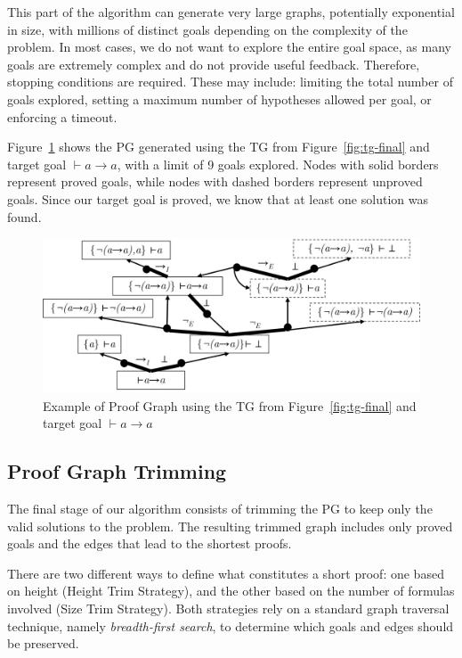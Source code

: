 This part of the algorithm can generate very large graphs, potentially exponential in size, with millions of distinct goals depending on the complexity of the problem. In most cases, we do not want to explore the entire goal space, as many goals are extremely complex and do not provide useful feedback. Therefore, stopping conditions are required. These may include: limiting the total number of goals explored, setting a maximum number of hypotheses allowed per goal, or enforcing a timeout.

Figure~\ref{fig:st-ex} shows the PG generated using the TG from Figure~\ref{fig:tg-final} and target goal \(\vdash a \to a\), with a limit of 9 goals explored. Nodes with solid borders represent proved goals, while nodes with dashed borders represent unproved goals. Since our target goal is proved, we know that at least one solution was found.

\begin{figure}
    \centering
    \includegraphics[width=0.8\linewidth]{resources/sg-gen.jpg}
    \caption{Example of Proof Graph using the TG from Figure~\ref{fig:tg-final} and target goal \(\vdash a \to a\)}
    \label{fig:st-ex}
\end{figure}

\subsection{Proof Graph Trimming}

The final stage of our algorithm consists of trimming the PG to keep only the valid solutions to the problem. The resulting trimmed graph includes only proved goals and the edges that lead to the shortest proofs.

There are two different ways to define what constitutes a short proof: one based on height (Height Trim Strategy), and the other based on the number of formulas involved (Size Trim Strategy). Both strategies rely on a standard graph traversal technique, namely \emph{breadth-first search}, to determine which goals and edges should be preserved.\\

